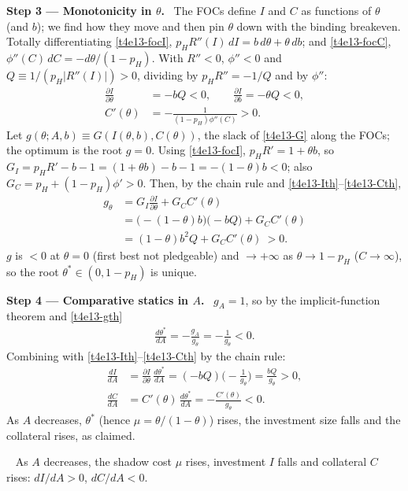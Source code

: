 \documentclass[11pt,a4paper]{article}
\newcommand{\step}[2]{\par\medskip\noindent\textbf{Step #1 --- #2.}~}
\newcommand{\answer}[1]{\par\smallskip\noindent\fbox{\textbf{Answer #1.}}~}
\begin{document}
\step{3}{Monotonicity in $\theta$} The FOCs define $I$ and $C$ as functions of $\theta$ (and $b$);
we find how they move and then pin $\theta$ down with the binding breakeven. Totally differentiating
\eqref{t4e13-focI}, $p_HR''(I)\,dI=b\,d\theta+\theta\,db$; and \eqref{t4e13-focC},
$\phi''(C)\,dC=-d\theta/(1-p_H)$. With $R''<0$, $\phi''<0$ and $Q\equiv1/(p_H|R''(I)|)>0$, dividing by
$p_HR''=-1/Q$ and by $\phi''$:
\begin{align}
  \frac{\partial I}{\partial\theta} &= -bQ<0,\qquad \frac{\partial I}{\partial b}=-\theta Q<0, \label{t4e13-Ith}\\
  C'(\theta) &= -\frac{1}{(1-p_H)\phi''(C)}>0. \label{t4e13-Cth}
\end{align}
Let $g(\theta;A,b)\equiv G(I(\theta,b),C(\theta))$, the slack of \eqref{t4e13-G} along the FOCs; the
optimum is the root $g=0$. Using \eqref{t4e13-focI}, $p_HR'=1+\theta b$, so
$G_I=p_HR'-b-1=(1+\theta b)-b-1=-(1-\theta)b<0$; also $G_C=p_H+(1-p_H)\phi'>0$. Then, by the chain
rule and \eqref{t4e13-Ith}--\eqref{t4e13-Cth},
\begin{align}
  g_\theta &= G_I\frac{\partial I}{\partial\theta}+G_CC'(\theta) \nonumber\\
           &= \big(-(1-\theta)b\big)\big(-bQ\big)+G_CC'(\theta) \nonumber\\
           &= (1-\theta)b^2Q+G_CC'(\theta)\ >0. \label{t4e13-gth}
\end{align}
$g$ is $<0$ at $\theta=0$ (first best not pledgeable) and $\to+\infty$ as $\theta\to1-p_H$ ($C\to\infty$),
so the root $\theta^*\in(0,1-p_H)$ is unique.

\step{4}{Comparative statics in $A$} $g_A=1$, so by the implicit-function theorem and \eqref{t4e13-gth}
\begin{align}
  \frac{d\theta^*}{dA} = -\frac{g_A}{g_\theta} = -\frac{1}{g_\theta}<0. \label{t4e13-thA}
\end{align}
Combining with \eqref{t4e13-Ith}--\eqref{t4e13-Cth} by the chain rule:
\begin{align}
  \frac{dI}{dA} &= \frac{\partial I}{\partial\theta}\,\frac{d\theta^*}{dA}=(-bQ)\Big(-\frac{1}{g_\theta}\Big)=\frac{bQ}{g_\theta}>0, \nonumber\\
  \frac{dC}{dA} &= C'(\theta)\,\frac{d\theta^*}{dA}=-\frac{C'(\theta)}{g_\theta}<0. \nonumber
\end{align}
As $A$ decreases, $\theta^*$ (hence $\mu=\theta/(1-\theta)$) rises, the investment size falls and the
collateral rises, as claimed.

\answer{(balance sheet)} As $A$ decreases, the shadow cost $\mu$ rises, investment $I$ falls and
collateral $C$ rises: $dI/dA>0$, $dC/dA<0$.
\end{document}
